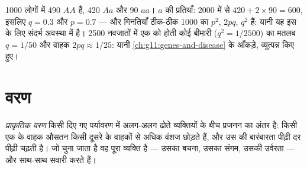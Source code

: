 \begin{example}[युग्मविकल्पी गिनना]\label{ex:g12:selection-drift-speciation:count}
1000 लोगों में 490 $AA$ हैं, 420 $Aa$ और 90 $aa$। $a$ की प्रतियाँ:
2000 में से $420 + 2 \times 90 = 600$, इसलिए $q = 0.3$ और $p = 0.7$ ---
और  गिनतियाँ ठीक-ठीक 1000 का $p^2$, $2pq$, $q^2$ हैं: यानी यह
 इस  के लिए संदर्भ अवस्था में है। 2500 नवजातों में एक को होती कोई
 बीमारी ($q^2 = 1/2500$) का मतलब $q = 1/50$ और वाहक
$2pq \approx 1/25$: यानी \cref{ch:g11:genes-and-disease} के आँकड़े,
व्युत्पन्न किए हुए।
\end{example}

\section{वरण}

\begin{definition}[प्राकृतिक वरण]\label{def:g12:selection-drift-speciation:selection}
\emph{प्राकृतिक वरण} किसी दिए गए पर्यावरण में
अलग-अलग  ढोते व्यक्तियों के बीच प्रजनन का अंतर है: किसी एक
 के वाहक औसतन किसी दूसरे के वाहकों से अधिक वंशज छोड़ते हैं, और
उस  की बारंबारता पीढ़ी दर पीढ़ी चढ़ती है। जो चुना जाता है वह
पूरा व्यक्ति है --- उसका बचना, उसका संगम, उसकी उर्वरता --- और
 साथ-साथ सवारी करते हैं।
\end{definition}

